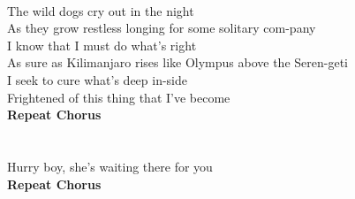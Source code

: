                     \\
 The wild dogs  cry out in the  night\\
As  they grow restless  longing for some  solitary  com-pany \\
 I know that  I must do what's  right\\
As sure as  Kilimanjaro  rises like  Olympus above the  Seren-geti \\
 I seek to  cure what's deep in-side\\
 Frightened of this  thing that I've become\\
\textbf{Repeat Chorus}\\
                    \\
        \\
            Hurry boy, she's  waiting there for you \\
\textbf{Repeat Chorus}\\
                    \\
